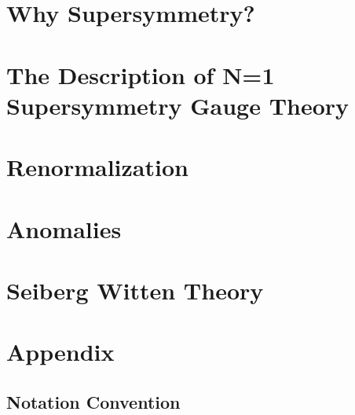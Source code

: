 \documentclass{fduthesis-en}
\begin{document}
\chapter{Why Supersymmetry?}
\chapter{The Description of N=1 Supersymmetry Gauge Theory}
\cite{ryder1996quantum}
\chapter{Renormalization}
\chapter{Anomalies}
\chapter{Seiberg Witten Theory}
\chapter{Appendix}
  \section{Notation Convention}
\printbibliography
\end{document}
